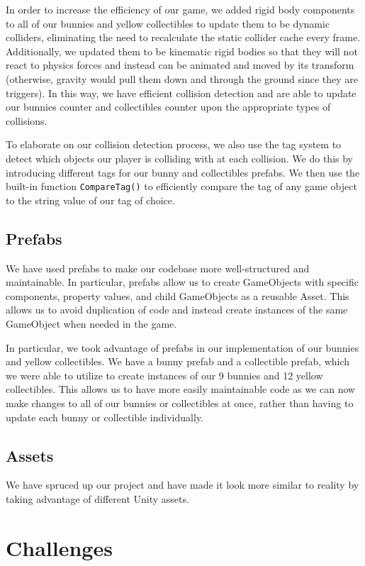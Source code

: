 \documentclass[12pt]{article}
\begin{document}
  In order to increase the efficiency of our game, we added rigid body components to all of our bunnies and yellow collectibles to update them to be dynamic colliders, eliminating the need to recalculate the static collider cache every frame. Additionally, we updated them to be kinematic rigid bodies so that they will not react to physics forces and instead can be animated and moved by its transform (otherwise, gravity would pull them down and through the ground since they are triggers). 
  In this way, we have efficient collision detection and are able to update our bunnies counter and collectibles counter upon the appropriate types of collisions. 

  To elaborate on our collision detection process, we also use the tag system to detect which objects our player is colliding with at each collision. We do this by introducing different tags for our bunny and collectibles prefabs. We then use the built-in function \verb+CompareTag()+ to efficiently compare the tag of any game object to the string value of our tag of choice. 

\subsection{Prefabs}
  We have used prefabs to make our codebase more well-structured and maintainable.
  In particular, prefabs allow us to create GameObjects with specific components, property values, and child GameObjects as a reusable Asset. This allows us to avoid duplication of code and instead create instances of the same GameObject when needed in the game. 

  In particular, we took advantage of prefabs in our implementation of our bunnies and yellow collectibles. We have a bunny prefab and a collectible prefab, which we were able to utilize to create instances of our 9 bunnies and 12 yellow collectibles. This allows us to have more easily maintainable code as we can now make changes to all of our bunnies or collectibles at once, rather than having to update each bunny or collectible individually.


\subsection{Assets}
  We have spruced up our project and have made it look more similar to reality by taking advantage of different Unity assets.


\section{Challenges}
\end{document}
